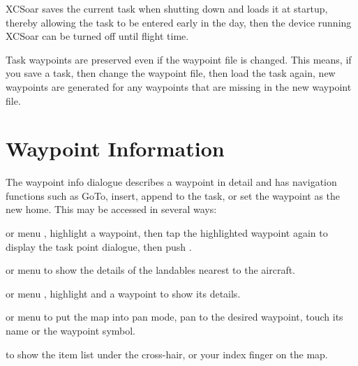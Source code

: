 XCSoar saves the current task when shutting down and loads it at
startup, thereby allowing the task to be entered early in the day,
then the device running XCSoar can be turned off until flight time.

Task waypoints are preserved even if the waypoint
file is changed.  This means, if you save a task, then change the
waypoint file, then load the task again, new waypoints are generated
for any waypoints that are missing in the new waypoint file.

\section{Waypoint Information}

The waypoint info dialogue describes a waypoint in detail and has
navigation functions such as GoTo, insert, append to the task, or set the 
waypoint as the new home.
This may be accessed in several ways:

or menu \blink{},
highlight a waypoint, then tap the highlighted waypoint again to display the 
task point dialogue, then push .

or menu \blink{}
to show the
details of the landables nearest to the aircraft.

or menu \blink{}
, highlight and  a waypoint to show its details.

or menu \blink{} to put the 
map into pan mode, pan to the desired waypoint, touch its name or the waypoint 
symbol.

\blink{}
to show the
item list under the cross-hair, or your index finger on the map.

